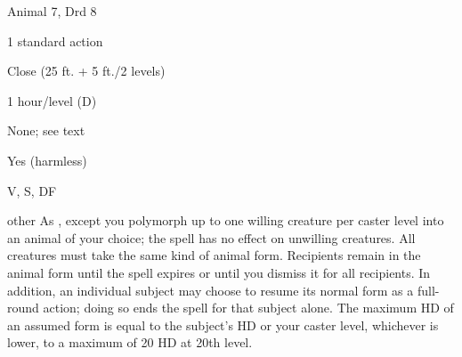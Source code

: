 
\begin{description*}
\item[Level:] Animal 7, Drd 8
\item[Casting Time:] 1 standard action
\item[Range:] Close (25 ft. + 5 ft./2 levels)
\item[Duration:] 1 hour/level (D)
\item[Saving Throw:] None; see text
\item[Spell Resistance:] Yes (harmless)
\item[Components:] V, S, DF
\end{description*}

other
As , except you polymorph up to one willing creature per caster
level into an animal of your choice; the spell has no effect on unwilling creatures.
All creatures must take the same kind of animal form. Recipients remain in the
animal form until the spell expires or until you dismiss it for all recipients.
In addition, an individual subject may choose to resume its normal form as a full-round
action; doing so ends the spell for that subject alone. The maximum HD of an assumed
form is equal to the subject's HD or your caster level, whichever is lower, to
a maximum of 20 HD at 20th level.